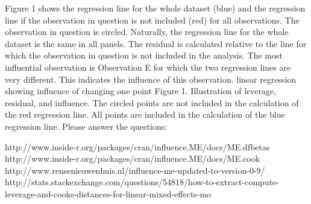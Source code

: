 Figure 1 shows the regression line for the whole dataset (blue) and the regression line if the observation in question is not included (red) for all observations. The observation in question is circled. Naturally, the regression line for the whole dataset is the same in all panels. The residual is calculated relative to the line for which the observation in question is not included in the analysis. The most influential observation is Observation E for which the two regression lines are very different. This indicates the influence of this observation.
linear regression showing influence of changing one point
Figure 1. Illustration of leverage, residual, and influence. The circled points are not included in the calculation of the red regression line. All points are included in the calculation of the blue regression line.
Please answer the questions:

http://www.inside-r.org/packages/cran/influence.ME/docs/ME.dfbetas
http://www.inside-r.org/packages/cran/influence.ME/docs/ME.cook
http://www.rensenieuwenhuis.nl/influence-me-updated-to-version-0-9/
http://stats.stackexchange.com/questions/54818/how-to-extract-compute-leverage-and-cooks-distances-for-linear-mixed-effects-mo
